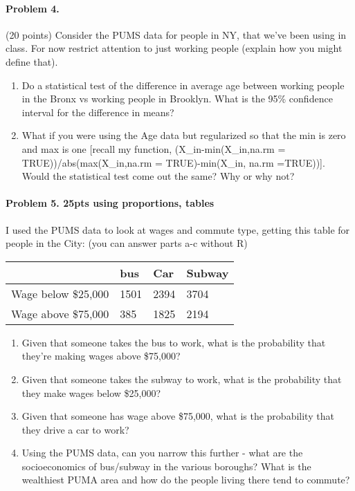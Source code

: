 \documentclass[]{article}
\providecommand{\tightlist}{%
  \setlength{\itemsep}{0pt}\setlength{\parskip}{0pt}}
\let\oldparagraph\paragraph
\renewcommand{\paragraph}[1]{\oldparagraph{#1}\mbox{}}
\begin{document}
\paragraph{Problem 4.}\label{problem-4.-1}

(20 points) Consider the PUMS data for people in NY, that we've been
using in class. For now restrict attention to just working people
(explain how you might define that).

\begin{enumerate}
\def\labelenumi{\alph{enumi}.}
\tightlist
\item
  Do a statistical test of the difference in average age between working
  people in the Bronx vs working people in Brooklyn. What is the 95\%
  confidence interval for the difference in means?
\item
  What if you were using the Age data but regularized so that the min is
  zero and max is one {[}recall my function, (X\_in-min(X\_in,na.rm =
  TRUE))/abs(max(X\_in,na.rm = TRUE)-min(X\_in, na.rm =TRUE)){]}. Would
  the statistical test come out the same? Why or why not?
\end{enumerate}

\paragraph{Problem 5. 25pts using proportions,
tables}\label{problem-5.-25pts-using-proportions-tables}

I used the PUMS data to look at wages and commute type, getting this
table for people in the City: (you can answer parts a-c without R)

\begin{longtable}[]{@{}llll@{}}
\toprule
& bus & Car & Subway\tabularnewline
\midrule
\endhead
Wage below \$25,000 & 1501 & 2394 & 3704\tabularnewline
Wage above \$75,000 & 385 & 1825 & 2194\tabularnewline
\bottomrule
\end{longtable}

\begin{enumerate}
\def\labelenumi{\alph{enumi}.}
\tightlist
\item
  Given that someone takes the bus to work, what is the probability that
  they're making wages above \$75,000?
\item
  Given that someone takes the subway to work, what is the probability
  that they make wages below \$25,000?
\item
  Given that someone has wage above \$75,000, what is the probability
  that they drive a car to work?
\item
  Using the PUMS data, can you narrow this further - what are the
  socioeconomics of bus/subway in the various boroughs? What is the
  wealthiest PUMA area and how do the people living there tend to
  commute?
\end{enumerate}
\end{document}

